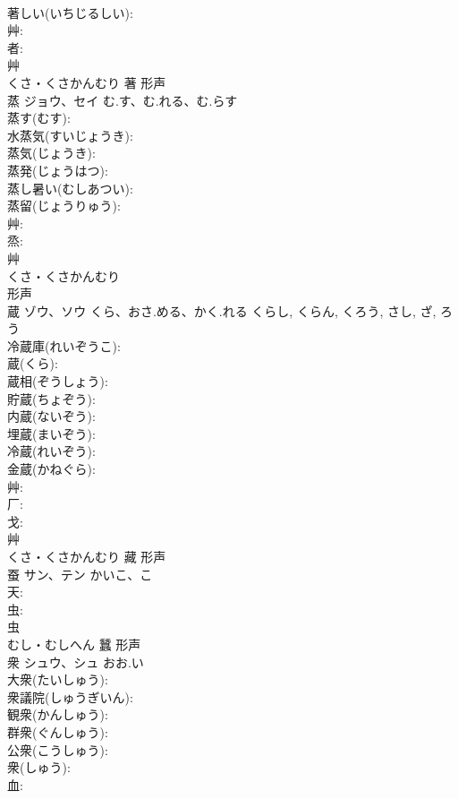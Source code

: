 \documentclass[8pt]{extreport}
\begin{document}
\begin{CJK}{UTF8}{min}
\\	著しい(いちじるしい): 
\\	艸: 
\\	者: 
\\	艸	
\\	くさ・くさかんむり	著	形声 
\\	蒸	ジョウ、セイ	む.す、む.れる、む.らす		
\\	蒸す(むす): 
\\	水蒸気(すいじょうき): 
\\	蒸気(じょうき): 
\\	蒸発(じょうはつ): 
\\	蒸し暑い(むしあつい): 
\\	蒸留(じょうりゅう): 
\\	艸: 
\\	烝: 
\\	艸	
\\	くさ・くさかんむり	
\\	形声 
\\	蔵	ゾウ、ソウ	くら、おさ.める、かく.れる	くらし, くらん, くろう, さし, ざ, ろう	
\\	冷蔵庫(れいぞうこ): 
\\	蔵(くら): 
\\	蔵相(ぞうしょう): 
\\	貯蔵(ちょぞう): 
\\	内蔵(ないぞう): 
\\	埋蔵(まいぞう): 
\\	冷蔵(れいぞう): 
\\	金蔵(かねぐら): 
\\	艸: 
\\	厂: 
\\	戈: 
\\	艸	
\\	くさ・くさかんむり	藏	形声 
\\	蚕	サン、テン	かいこ、こ		
\\	天: 
\\	虫: 
\\	虫	
\\	むし・むしへん	蠶	形声 
\\	衆	シュウ、シュ	おお.い		
\\	大衆(たいしゅう): 
\\	衆議院(しゅうぎいん): 
\\	観衆(かんしゅう): 
\\	群衆(ぐんしゅう): 
\\	公衆(こうしゅう): 
\\	衆(しゅう): 
\\	血: 

\end{CJK}
\end{document}
